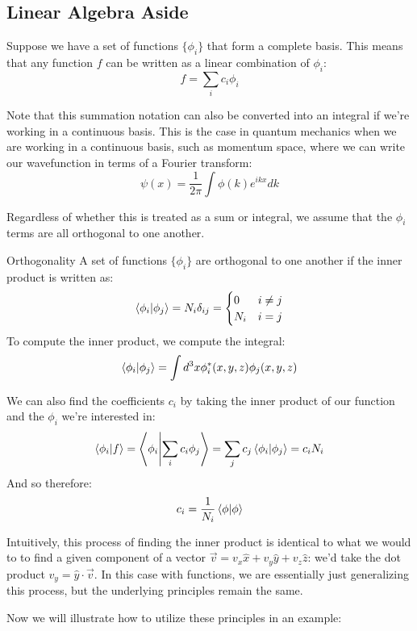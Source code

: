 \subsection{Linear Algebra Aside}
Suppose we have a set of functions $\{ \phi_i\}$ that form a complete basis. This means that any function $f$
 can be written as a linear combination of $\phi_i$: 
 \[ f = \sum_i c_i \phi_i \]
 \begin{insight*}{}
 		Note that this summation notation can also be converted into an integral if we're working in a continuous
		basis. This is the case in quantum mechanics when we are working in a continuous basis, such as momentum 
		space, where we can write our wavefunction in terms of a Fourier transform: 
		\[ \psi(x) = \frac{1}{2\pi}\int \phi(k) e^{ikx} dk\]
 \end{insight*}
Regardless of whether this is treated as a sum or integral, we assume that the $\phi_i$ terms are all orthogonal 
to one another.
\begin{notation*}{Orthogonality}
		A set of functions $\{\phi_i\}$ are orthogonal to one another if the inner product is written as:
		 \[ \braket{\phi_i}{\phi_j} = N_i \delta_{ij} = \begin{cases}
		 0 & i \neq j\\
		 N_i & i = j
 		\end{cases}\]
		To compute the inner product, we compute the integral: 
		\[ \braket{\phi_i}{\phi_j} = \int d^3x \phi_i^*(x, y, z) \phi_j(x, y, z)\]
\end{notation*}
We can also find the coefficients $c_i$ by taking the inner product of our function and the $\phi_i$ we're 
interested in:
\[ \braket{\phi_i}{f} = \braket{\phi_i}{\sum_i c_i \phi_j} = \sum_j c_j \braket{\phi_i}{\phi_j} = c_i N_i\]
And so therefore: 
\[ c_i = \frac{1}{N_i}\braket{\phi}\]
\begin{insight*}{}
		Intuitively, this process of finding the inner product is identical to what we would to to find a given 
		component of a vector $\vec v = v_x \hat{x} + v_y \hat{y} + v_z \hat{z}$: we'd take the dot product $v_y = 
		\hat{y} \cdot \vec v$. In this case with functions, we are essentially just generalizing this process,
		but the underlying principles remain the same.
\end{insight*}
Now we will illustrate how to utilize these principles in an example:


